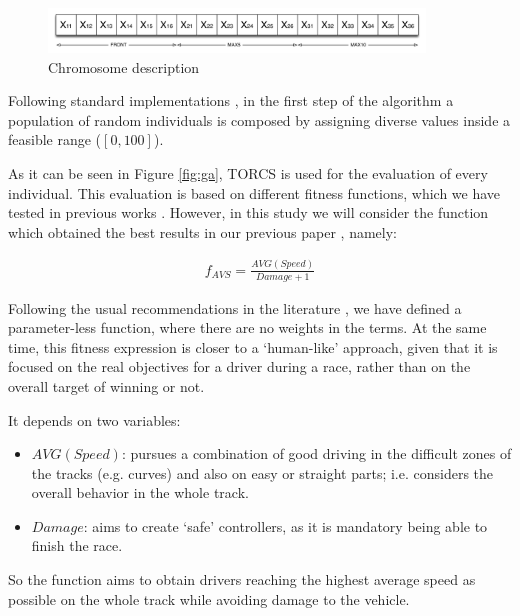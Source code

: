 \documentclass[10pt,journal,compsoc]{IEEEtran}
\begin{document}
 \begin{figure}[!ht]	
 	\begin{center}
 		\includegraphics[width=10cm]{fig/chromosome2.png}
 		\caption{Chromosome description}
 		\label{fig:cromosome}	
 	\end{center}	
 \end{figure}

Following standard implementations \cite{GAs_Goldberg89}, in the first step of the algorithm \cite{salem_evo17} a population of random individuals is composed by assigning diverse values inside a feasible range ($[0,100]$).

As it can be seen in Figure \ref{fig:ga}, TORCS is used for the evaluation of every individual. This evaluation is based on different fitness functions, which we have tested in previous works \cite{salem_evo18}. 
However, in this study we will consider the function which obtained the best results in our previous paper \cite{salem_cig2018}, namely:

 \begin{equation} \label{fit2}
 	\begin{array}{lll}
 		f_{AVS}= \frac{AVG(Speed)}{Damage+1}
 	\end{array}
 \end{equation}	

Following the usual recommendations in the literature \cite{Harik-ParameterLess99}, we have defined a parameter-less function, where there are no weights in the terms.
At the same time, this fitness expression is closer to a `human-like' approach, given that it is focused on the real objectives for a driver during a race, rather than on the overall target of winning or not. 

It depends on two variables:

 \begin{itemize}
 	\item $AVG(Speed)$: pursues a combination of good driving in the difficult zones of the tracks (e.g. curves) and also on easy or straight parts; i.e. considers the overall behavior in the whole track.
 	\item $Damage$: aims to create `safe' controllers, as it is mandatory being able to finish the race.
 \end{itemize} 

So the function aims to obtain drivers reaching the highest average speed as possible on the whole track while avoiding damage to the vehicle.
\end{document}

